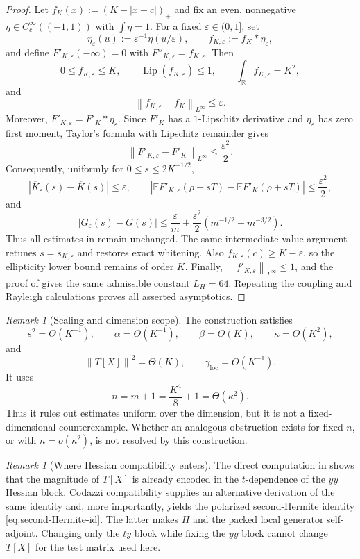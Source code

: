 \documentclass[11pt]{article}
\theoremstyle{plain}
\theoremstyle{definition}
\theoremstyle{remark}
\newtheorem{remark}[theorem]{Remark}
\newcommand{\R}{\mathbb{R}}
\newcommand{\E}{\mathbb{E}}
\newcommand{\Lip}{\operatorname{Lip}}
\newcommand{\1}{\mathbf{1}}
\newcommand{\norm}[1]{\left\lVert #1\right\rVert}
\newcommand{\abs}[1]{\left\lvert #1\right\rvert}
\begin{document}
\begin{proof}
Let $f_K(x):=(K-\abs{x-c})_+$ and fix an even, nonnegative
$\eta\in C_c^\infty((-1,1))$ with $\int\eta=1$. For a fixed
$\varepsilon\in(0,1]$, set
\[
    \eta_\varepsilon(u):=\varepsilon^{-1}\eta(u/\varepsilon),
    \qquad
    f_{K,\varepsilon}:=f_K*\eta_\varepsilon,
\]
and define $F'_{K,\varepsilon}(-\infty)=0$ with
$F''_{K,\varepsilon}=f_{K,\varepsilon}$. Then
\[
    0\leq f_{K,\varepsilon}\leq K,
    \qquad
    \Lip(f_{K,\varepsilon})\leq1,
    \qquad
    \int_\R f_{K,\varepsilon}=K^2,
\]
and
\[
    \norm{f_{K,\varepsilon}-f_K}_{L^\infty}\leq\varepsilon.
\]
Moreover, $F'_{K,\varepsilon}=F'_K*\eta_\varepsilon$. Since $F'_K$ has a
$1$-Lipschitz derivative and $\eta_\varepsilon$ has zero first moment,
Taylor's formula with Lipschitz remainder gives
\[
    \norm{F'_{K,\varepsilon}-F'_K}_{L^\infty}
    \leq
    \frac{\varepsilon^2}{2}.
\]
Consequently, uniformly for $0\leq s\leq2K^{-1/2}$,
\[
    \abs{\overline K_\varepsilon(s)-\overline K(s)}\leq\varepsilon,
    \qquad
    \abs{\E F'_{K,\varepsilon}(\rho+sT)-\E F'_K(\rho+sT)}
    \leq
    \frac{\varepsilon^2}{2},
\]
and
\[
    \abs{G_\varepsilon(s)-G(s)}
    \leq
    \frac{\varepsilon}{m}
    +
    \frac{\varepsilon^2}{2}
    \left(m^{-1/2}+m^{-3/2}\right).
\]
Thus all estimates in  remain unchanged. The same
intermediate-value argument retunes $s=s_{K,\varepsilon}$ and restores exact
whitening. Also $f_{K,\varepsilon}(c)\geq K-\varepsilon$, so the ellipticity
lower bound remains of order $K$. Finally,
$\norm{f'_{K,\varepsilon}}_{L^\infty}\leq1$, and the proof of
 gives the same admissible constant $L_H=64$. Repeating the
coupling and Rayleigh calculations proves all asserted asymptotics.
\end{proof}

\begin{remark}[Scaling and dimension scope]
The construction satisfies
\[
    s^2=\Theta(K^{-1}),
    \qquad
    \alpha=\Theta(K^{-1}),
    \qquad
    \beta=\Theta(K),
    \qquad
    \kappa=\Theta(K^2),
\]
and
\[
    \norm{T[X]}^2=\Theta(K),
    \qquad
    \gamma_{\mathrm{loc}}=O(K^{-1}).
\]
It uses
\[
    n=m+1=\frac{K^4}{8}+1=\Theta(\kappa^2).
\]
Thus it rules out estimates uniform over the dimension, but it is not a
fixed-dimensional counterexample. Whether an analogous obstruction exists
for fixed $n$, or with $n=o(\kappa^2)$, is not resolved by this construction.
\end{remark}

\begin{remark}[Where Hessian compatibility enters]
The direct computation in  shows that the magnitude of
$T[X]$ is already encoded in the $t$-dependence of the $yy$ Hessian block.
Codazzi compatibility supplies an alternative derivation of the same
identity and, more importantly, yields the polarized second-Hermite identity
\eqref{eq:second-Hermite-id}. The latter makes $H$ and the packed local
generator self-adjoint. Changing only the $ty$ block while fixing the $yy$
block cannot change $T[X]$ for the test matrix used here.
\end{remark}
\end{document}
